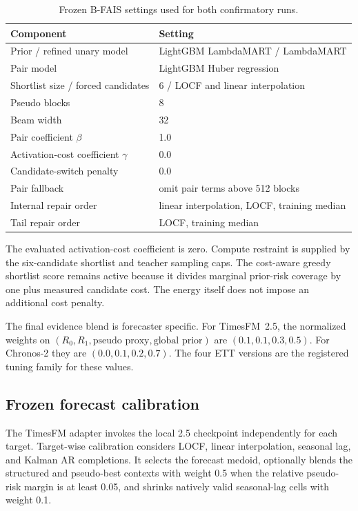 \begin{table}[h]
\centering
\small
\caption{Frozen B-FAIS settings used for both confirmatory runs.}
\label{tab:bfais-settings}
\begin{tabular}{ll}
\toprule
Component & Setting \\
\midrule
Prior / refined unary model & LightGBM LambdaMART / LambdaMART \\
Pair model & LightGBM Huber regression \\
Shortlist size / forced candidates & 6 / LOCF and linear interpolation \\
Pseudo blocks & 8 \\
Beam width & 32 \\
Pair coefficient $\beta$ & 1.0 \\
Activation-cost coefficient $\gamma$ & 0.0 \\
Candidate-switch penalty & 0.0 \\
Pair fallback & omit pair terms above 512 blocks \\
Internal repair order & linear interpolation, LOCF, training median \\
Tail repair order & LOCF, training median \\
\bottomrule
\end{tabular}
\end{table}

The evaluated activation-cost coefficient is zero. Compute restraint is supplied by the six-candidate shortlist and teacher sampling caps. The cost-aware greedy shortlist score remains active because it divides marginal prior-risk coverage by one plus measured candidate cost. The energy itself does not impose an additional cost penalty.

The final evidence blend is forecaster specific. For TimesFM~2.5, the normalized weights on $(R_0,R_1,\text{pseudo proxy},\text{global prior})$ are $(0.1,0.1,0.3,0.5)$. For Chronos-2 they are $(0.0,0.1,0.2,0.7)$. The four ETT versions are the registered tuning family for these values.

\subsection{Frozen forecast calibration}

The TimesFM adapter invokes the local 2.5 checkpoint independently for each target. Target-wise calibration considers LOCF, linear interpolation, seasonal lag, and Kalman AR completions. It selects the forecast medoid, optionally blends the structured and pseudo-best contexts with weight 0.5 when the relative pseudo-risk margin is at least 0.05, and shrinks natively valid seasonal-lag cells with weight 0.1.

